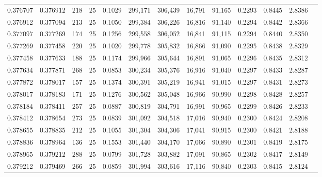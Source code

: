 \begin{tabular}{rrrrrrrrrrrrr}
0.376707 & 0.376912 &   218 &  25 &                                     0.1029 & 299,171 & 306,439 &  16,791 &  91,165 & 0.2293 & 0.8445 & 2.8386 \\
0.376912 & 0.377094 &   213 &  25 &                                     0.1050 & 299,384 & 306,226 &  16,816 &  91,140 & 0.2294 & 0.8442 & 2.8366 \\
0.377097 & 0.377269 &   174 &  25 &                                     0.1256 & 299,558 & 306,052 &  16,841 &  91,115 & 0.2294 & 0.8440 & 2.8350 \\
0.377269 & 0.377458 &   220 &  25 &                                     0.1020 & 299,778 & 305,832 &  16,866 &  91,090 & 0.2295 & 0.8438 & 2.8329 \\
0.377458 & 0.377633 &   188 &  25 &                                     0.1174 & 299,966 & 305,644 &  16,891 &  91,065 & 0.2296 & 0.8435 & 2.8312 \\
0.377634 & 0.377871 &   268 &  25 &                                     0.0853 & 300,234 & 305,376 &  16,916 &  91,040 & 0.2297 & 0.8433 & 2.8287 \\
0.377872 & 0.378017 &   157 &  25 &                                     0.1374 & 300,391 & 305,219 &  16,941 &  91,015 & 0.2297 & 0.8431 & 2.8273 \\
0.378017 & 0.378183 &   171 &  25 &                                     0.1276 & 300,562 & 305,048 &  16,966 &  90,990 & 0.2298 & 0.8428 & 2.8257 \\
0.378184 & 0.378411 &   257 &  25 &                                     0.0887 & 300,819 & 304,791 &  16,991 &  90,965 & 0.2299 & 0.8426 & 2.8233 \\
0.378412 & 0.378654 &   273 &  25 &                                     0.0839 & 301,092 & 304,518 &  17,016 &  90,940 & 0.2300 & 0.8424 & 2.8208 \\
0.378655 & 0.378835 &   212 &  25 &                                     0.1055 & 301,304 & 304,306 &  17,041 &  90,915 & 0.2300 & 0.8421 & 2.8188 \\
0.378836 & 0.378964 &   136 &  25 &                                     0.1553 & 301,440 & 304,170 &  17,066 &  90,890 & 0.2301 & 0.8419 & 2.8175 \\
0.378965 & 0.379212 &   288 &  25 &                                     0.0799 & 301,728 & 303,882 &  17,091 &  90,865 & 0.2302 & 0.8417 & 2.8149 \\
0.379212 & 0.379469 &   266 &  25 &                                     0.0859 & 301,994 & 303,616 &  17,116 &  90,840 & 0.2303 & 0.8415 & 2.8124 \\

\end{tabular}
